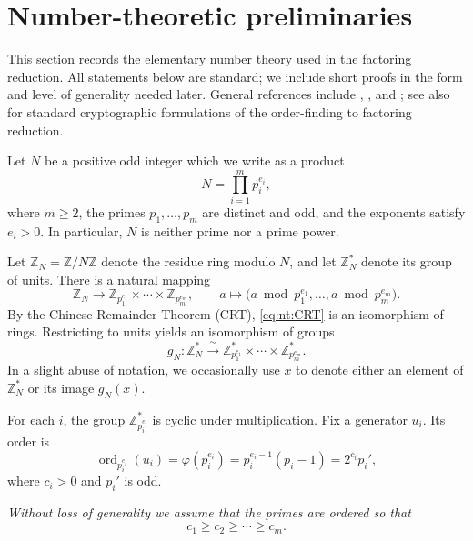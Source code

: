 \documentclass[11pt,reqno]{article}
\numberwithin{equation}{section}
\theoremstyle{plain}
\theoremstyle{definition}
\theoremstyle{remark}
\begin{document}
\section{Number-theoretic preliminaries}
\label{3}

This section records the elementary number theory used in the factoring reduction.
All statements below are standard; we include short proofs in the form and level of generality
needed later. General references include \cite[Chs.~1--3]{HardyWright},
\cite[Chs.~2--4]{CrandallPomerance}, and \cite[Chs.~2--4]{BachShallit}; see also
\cite[\S 2--5]{MenezesBook} for standard cryptographic formulations of the order-finding
to factoring reduction.

Let $N$ be a positive odd integer which we write as a product
\begin{equation}\label{eq:nt:N-factor}
N=\prod_{i=1}^{m} p_i^{e_i},
\end{equation}
where $m\ge 2$, the primes $p_1,\dots,p_m$ are distinct and odd, and the exponents satisfy $e_i>0$.
In particular, $N$ is neither prime nor a prime power.

Let $\mathbb{Z}_N=\mathbb{Z}/N\mathbb{Z}$ denote the residue ring modulo $N$, and let
$\mathbb{Z}_N^\ast$ denote its group of units.  There is a natural mapping
\begin{equation}\label{eq:nt:CRT}
\mathbb{Z}_N \longrightarrow
\mathbb{Z}_{p_1^{e_1}}\times \cdots \times \mathbb{Z}_{p_m^{e_m}},
\qquad
a \longmapsto \bigl(a \bmod p_1^{e_1},\dots,a \bmod p_m^{e_m}\bigr).
\end{equation}
By the Chinese Remainder Theorem (CRT), \eqref{eq:nt:CRT} is an isomorphism of rings.  Restricting to units
yields an isomorphism of groups
\begin{equation}\label{eq:nt:gN}
g_N:\mathbb{Z}_N^\ast \xrightarrow{\ \sim\ }
\mathbb{Z}_{p_1^{e_1}}^\ast\times \cdots \times \mathbb{Z}_{p_m^{e_m}}^\ast.
\end{equation}
In a slight abuse of notation, we occasionally use $x$ to denote either an element of $\mathbb{Z}_N^\ast$
or its image $g_N(x)$.

For each $i$, the group $\mathbb{Z}_{p_i^{e_i}}^\ast$ is cyclic under multiplication. Fix a generator $u_i$.
Its order is
\[
\operatorname{ord}_{p_i^{e_i}}(u_i)=\varphi(p_i^{e_i})=p_i^{e_i-1}(p_i-1)=2^{c_i}p_i',
\]
where $c_i>0$ and $p_i'$ is odd.

\medskip
\noindent
\emph{Without loss of generality we assume that the primes are ordered so that}
\begin{equation}
\label{decreciente} c_1\ge c_2\ge \cdots \ge c_m.
\end{equation}
\end{document}
